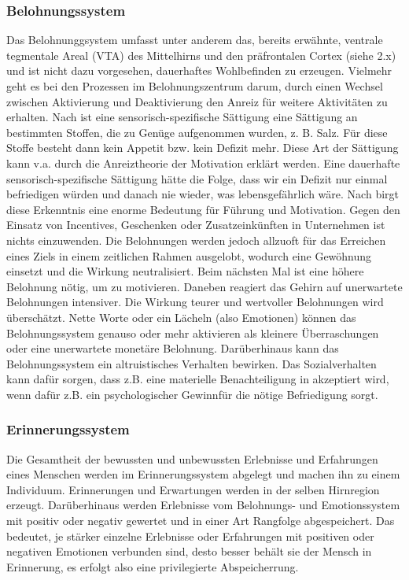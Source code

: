 \subsubsection{Belohnungssystem}
Das Belohnunggsystem umfasst unter anderem das, bereits erwähnte, ventrale tegmentale Areal (VTA) des Mittelhirns und den präfrontalen Cortex (siehe 2.x) und ist nicht dazu vorgesehen, dauerhaftes Wohlbefinden zu erzeugen. Vielmehr geht es bei den Prozessen im Belohnungszentrum darum, durch einen Wechsel zwischen Aktivierung und Deaktivierung den Anreiz für weitere Aktivitäten zu erhalten. \citep[S. 17]{Seelbach.2011}
\newline Nach \citet[S. 250]{Kirschbaum.2008} ist eine sensorisch-spezifische Sättigung eine Sättigung an bestimmten Stoffen, die zu Genüge aufgenommen wurden, z. B. Salz. Für diese Stoffe besteht dann kein Appetit bzw. kein Defizit mehr. Diese Art der Sättigung kann v.a. durch die Anreiztheorie der Motivation erklärt werden. Eine dauerhafte sensorisch-spezifische Sättigung hätte die Folge, dass wir ein Defizit nur einmal befriedigen würden und danach nie wieder, was lebensgefährlich wäre. \citep[S. 17]{Seelbach.2011} 
\newline Nach \citet[S. 17]{Seelbach.2011} birgt diese Erkenntnis eine enorme Bedeutung für Führung und Motivation. Gegen den Einsatz von Incentives, Geschenken oder Zusatzeinkünften in Unternehmen ist nichts einzuwenden. Die Belohnungen werden jedoch allzuoft für das Erreichen eines Ziels in einem zeitlichen Rahmen ausgelobt, wodurch eine Gewöhnung einsetzt und die Wirkung neutralisiert. Beim nächsten Mal ist eine höhere Belohnung nötig, um zu motivieren. Daneben reagiert das Gehirn auf unerwartete Belohnungen intensiver. Die Wirkung teurer und wertvoller Belohnungen wird überschätzt. Nette Worte oder ein Lächeln (also Emotionen) können das Belohnungssystem genauso oder mehr aktivieren als kleinere Überraschungen oder eine unerwartete monetäre Belohnung. Darüberhinaus kann das Belohnungssystem ein altruistisches Verhalten bewirken. Das Sozialverhalten kann dafür sorgen, dass z.B. eine materielle Benachteiligung in akzeptiert wird, wenn dafür z.B. ein \glqq psychologischer Gewinn\grqq für die nötige Befriedigung sorgt. \cite[S. 17]{Seelbach.2011}

\subsubsection{Erinnerungssystem}
Die Gesamtheit der bewussten und unbewussten Erlebnisse und Erfahrungen eines Menschen werden im Erinnerungssystem abgelegt und machen ihn zu einem Individuum. Erinnerungen und Erwartungen werden in der selben Hirnregion erzeugt. Darüberhinaus werden Erlebnisse vom Belohnungs- und Emotionssystem mit positiv oder negativ gewertet und in einer Art Rangfolge abgespeichert. 
Das bedeutet, je stärker einzelne Erlebnisse oder Erfahrungen mit positiven oder negativen Emotionen verbunden sind, desto besser behält sie der Mensch in Erinnerung, es erfolgt also eine \glqq privilegierte Abspeicherrung\grqq. \citep[S. 18]{Seelbach.2011}

